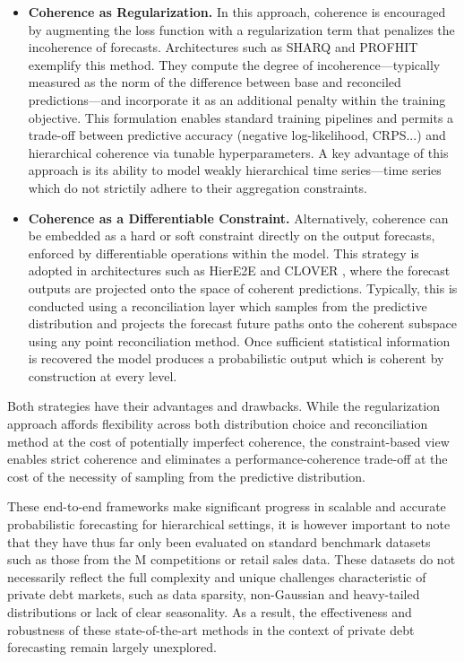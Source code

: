 \documentclass[letterpaper]{article}
\begin{document}
\begin{itemize}
    \item \textbf{Coherence as Regularization.}
In this approach, coherence is encouraged by augmenting the loss function with a regularization term that penalizes the incoherence of forecasts. 
Architectures such as SHARQ \cite{SHARQ} and PROFHIT \cite{PROFHIT} exemplify this method. 
They compute the degree of incoherence—typically measured as the norm of the difference between base and reconciled predictions—and incorporate it as an additional penalty within the training objective. 
This formulation enables standard training pipelines and permits a trade-off between predictive accuracy (negative log-likelihood, CRPS...) and hierarchical coherence via tunable hyperparameters. 
A key advantage of this approach is its ability to model weakly hierarchical time series---time series which do not strictily adhere to their aggregation constraints. 

\item \textbf{Coherence as a Differentiable Constraint.}
Alternatively, coherence can be embedded as a hard or soft constraint directly on the output forecasts, enforced by differentiable operations within the model. 
This strategy is adopted in architectures such as HierE2E \cite{HierE2E} and CLOVER \cite{CLOVER}, where the forecast outputs are projected onto the space of coherent predictions. 
Typically, this is conducted using a reconciliation layer which samples from the predictive distribution and projects the forecast future paths onto the coherent subspace using any point reconciliation method. 
Once sufficient statistical information is recovered the model produces a probabilistic output which is coherent by construction at every level.

\end{itemize}

Both strategies have their advantages and drawbacks. 
While the regularization approach affords flexibility across both distribution choice and reconciliation method at the cost of potentially imperfect coherence, the constraint-based view enables strict coherence and eliminates a performance-coherence trade-off at the cost of the necessity of sampling from the predictive distribution.

These end-to-end frameworks make significant progress in scalable and accurate probabilistic forecasting for hierarchical settings, it is however important to note that they have thus far only been evaluated on standard benchmark datasets such as those from the M competitions or retail sales data.
These datasets do not necessarily reflect the full complexity and unique challenges characteristic of private debt markets, such as data sparsity, non-Gaussian and heavy-tailed distributions or lack of clear seasonality. 
As a result, the effectiveness and robustness of these state-of-the-art methods in the context of private debt forecasting remain largely unexplored.
\end{document}

